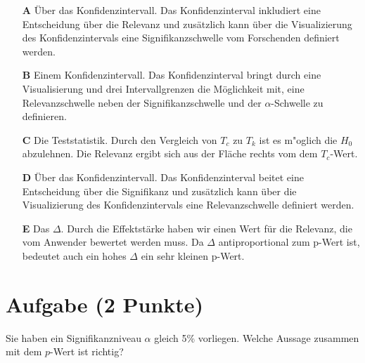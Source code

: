 \documentclass[a4paper, 9pt]{scrartcl}\usepackage[]{graphicx}\usepackage[]{xcolor}
\begin{document}
\begin{enumerate}
\item [\textbf{A} \msquare] Über das Konfidenzintervall. Das Konfidenzinterval inkludiert eine Entscheidung über die Relevanz und zusätzlich kann über die Visualizierung des Konfidenzintervals eine Signifikanzschwelle vom Forschenden definiert werden.
\item [\textbf{B} \msquare] Einem Konfidenzintervall. Das Konfidenzinterval bringt durch eine Visualisierung und drei Intervallgrenzen die Möglichkeit mit, eine Relevanzschwelle neben der Signifikanzschwelle und der $\alpha$-Schwelle zu definieren.
\item [\textbf{C} \msquare] Die Teststatistik. Durch den Vergleich von $T_c$ zu $T_k$ ist es m{"o}glich die $H_0$ abzulehnen. Die Relevanz ergibt sich aus der Fläche rechts vom dem $T_c$-Wert.
\item [\textbf{D} \msquare] Über das Konfidenzintervall. Das Konfidenzinterval beitet eine Entscheidung über die Signifikanz und zusätzlich kann über die Visualizierung des Konfidenzintervals eine Relevanzschwelle definiert werden.
\item [\textbf{E} \msquare] Das $\Delta$. Durch die Effektstärke haben wir einen Wert für die Relevanz, die vom Anwender bewertet werden muss. Da $\Delta$ antiproportional zum p-Wert ist, bedeutet auch ein hohes $\Delta$ ein sehr kleinen p-Wert.
\end{enumerate}

\section{Aufgabe \hfill (2 Punkte)}



Sie haben ein Signifikanzniveau $\alpha$ gleich 5\% vorliegen. Welche Aussage zusammen mit dem $p$-Wert ist richtig?
\end{document}
